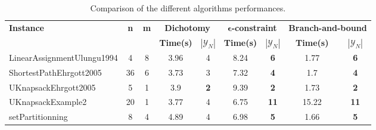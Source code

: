 \begin{table}[!h]
\centering
\hspace*{-1cm}\begin{tabular}{lcccccccc}
\toprule
\textbf{Instance} & \textbf{n} & \textbf{m} & \multicolumn{2}{c}{\textbf{Dichotomy}} & \multicolumn{2}{c}{\textbf{$\mathbf{\epsilon}$-constraint}}  & \multicolumn{2}{c}{\textbf{Branch-and-bound}}
\\
\cmidrule(r){4-5} \cmidrule(r){6-7} \cmidrule(r){8-9}
~ & ~ & ~ & \textbf{Time(s)} & \textbf{$|\mathcal{Y}_N|$} & \textbf{Time(s)} & \textbf{$|\mathcal{Y}_N|$} & \textbf{Time(s)} & \textbf{$|\mathcal{Y}_N|$} \\
\midrule

LinearAssignmentUlungu1994 & 4 & 8 & 3.96 & 4 & 8.24 &  \textbf{6} &  \textcolor{blue2}{1.77} &  \textbf{6} \\
ShortestPathEhrgott2005 & 36 & 6 & 3.73 & 3 & 7.32 &  \textbf{4} &  \textcolor{blue2}{1.7} &  \textbf{4} \\
UKnapsackEhrgott2005 & 5 & 1 & 3.9 &  \textbf{2} & 9.39 &  \textbf{2} &  \textcolor{blue2}{1.73} &  \textbf{2} \\
UKnapsackExample2 & 20 & 1 &  \textcolor{blue2}{3.77} & 4 & 6.75 &  \textbf{11} & 15.22 &  \textbf{11} \\
setPartitionning & 8 & 4 & 4.89 & 4 & 6.98 &  \textbf{5} &  \textcolor{blue2}{1.66} &  \textbf{5} \\
\bottomrule
\end{tabular}
\caption{Comparison of the different algorithms performances.}
\label{tab:table_compare}
\end{table}

